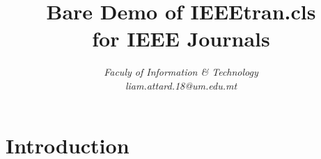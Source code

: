 \documentclass[conference]{IEEEtran}
\title{Bare Demo of IEEEtran.cls\\ for IEEE Journals}
\author{\IEEEauthorblockN{Liam Attard [0299300L] }
\IEEEauthorblockA{Department of Artificial Intelligence} 
\textit{Faculy of Information \& Technology }\\
\textit{liam.attard.18@um.edu.mt}}
\begin{document}
  \maketitle

  \section{Introduction}
    

  
  
\end{document}
